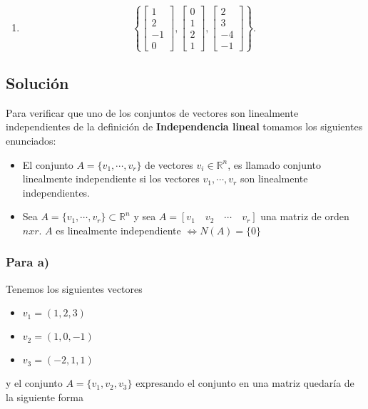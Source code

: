 \begin{enumerate}[label=\alph*)]
    \item

    \[
    \left\{ 
    \begin{bmatrix}
    1 \\ 
    2 \\ 
    -1 \\
    0
    \end{bmatrix}
    ,
    \begin{bmatrix}
    0 \\ 
    1 \\ 
    2 \\
    1
    \end{bmatrix}
    ,
    \begin{bmatrix}
    2 \\ 
    3 \\ 
    -4 \\
    -1
    \end{bmatrix} \right\}.
    \]

\end{enumerate}

\subsection{Solución}

Para verificar que uno de los conjuntos de vectores son linealmente independientes de la definición de \textbf{Independencia lineal} tomamos los siguientes enunciados:
\begin{itemize}
    \item El conjunto $A = \{ {v}_{1}, \cdots , {v}_{r} \}$ de vectores ${v}_{i} \in \mathbb{R}^n$, es llamado conjunto linealmente independiente si los vectores ${v}_{1}, \cdots , {v}_{r}$ son linealmente independientes.
    \item Sea $A = \{ {v}_{1}, \cdots , {v}_{r} \} \subset \mathbb{R}^n$ y sea $A = [ {v}_{1} \quad {v}_{2} \quad \cdots \quad {v}_{r} ]$ una matriz de orden $nxr$. $A$ es linealmente independiente $\iff N(A)=\{ 0 \}$
\end{itemize}

\subsubsection{Para a)}
Tenemos los siguientes vectores
\begin{itemize}
    \item ${v}_{1} = (1,2,3)$
    \item ${v}_{2} = (1,0,-1)$
    \item ${v}_{3} = (-2,1,1)$ 
\end{itemize}
y el conjunto $A=\{ {v}_{1}, {v}_{2}, {v}_{3} \}$ expresando el conjunto en una matriz quedaría de la siguiente forma

